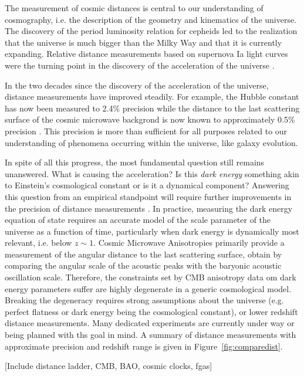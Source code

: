 The measurement of cosmic distances is central to our understanding of
cosmography, i.e. the description of the geometry and kinematics of
the universe. The discovery of the period luminosity relation for
cepheids led to the realization that the universe is much bigger than
the Milky Way and that it is currently expanding. Relative distance
measurements based on supernova Ia light curves were the turning point
in the discovery of the acceleration of the universe
\citep{Riess:1998p21184,Per++99}.

In the two decades since the discovery of the acceleration of the
universe, distance measurements have improved steadily. For example,
the Hubble constant has now been measured to 2.4\% precision
\citep{Rie++16} while the distance to the last scattering surface of
the cosmic microwave backgrond is now known to approximately 0.5\%
precision \cite[depending on the assumed cosmological
model]{WMAP9,Planck15}. This precision is more than sufficient for all
purposes related to our understanding of phenomena occurring within
the universe, like galaxy evolution.

In spite of all this progress, the most fundamental question still
remains unanswered. What is causing the acceleration? Is this {\it
dark energy} something akin to Einstein's cosmological constant or is
it a dynamical component? Answering this question from an empirical
standpoint will require further improvements in the precision of
distance measurements \citep{Suy++12,Wei++13,Rie++16}.  In practice,
measuring the dark energy equation of state requires an accurate model
of the scale parameter of the universe as a function of time,
particularly when dark energy is dynamically most relevant, i.e. below
$z\sim1$. Cosmic Microwave Anisotropies primarily provide a
measurement of the angular distance to the last scattering surface,
obtain by comparing the angular scale of the acoustic peaks with the
baryonic acoustic oscillation scale. Therefore, the constraints set by
CMB anisotropy data om dark energy parameters suffer are highly
degenerate in a generic cosmological model. Breaking the degeneracy
requires strong assumptions about the universe (e.g. perfect flatness
or dark energy being the cosmological constant), or lower redshift
distance measurements. Many dedicated experiments are currently under
way or being planned with ths goal in mind. A summary of distance
measurements with approximate precision and redshift range is given in
Figure~\ref{fig:comparedist}.

[Include distance ladder, CMB, BAO, cosmic clocks, fgas]


